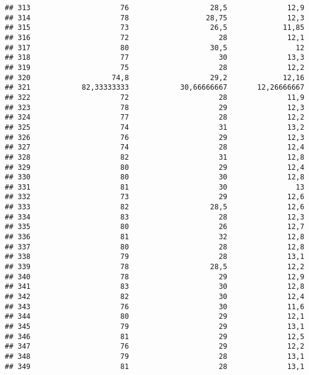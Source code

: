 \documentclass[
]{article}
\begin{document}
\begin{verbatim}
## 313                     76                   28,5              12,9
## 314                     78                  28,75              12,3
## 315                     73                   26,5             11,85
## 316                     72                     28              12,1
## 317                     80                   30,5                12
## 318                     77                     30              13,3
## 319                     75                     28              12,2
## 320                   74,8                   29,2             12,16
## 321            82,33333333            30,66666667       12,26666667
## 322                     72                     28              11,9
## 323                     78                     29              12,3
## 324                     77                     28              12,2
## 325                     74                     31              13,2
## 326                     76                     29              12,3
## 327                     74                     28              12,4
## 328                     82                     31              12,8
## 329                     80                     29              12,4
## 330                     80                     30              12,8
## 331                     81                     30                13
## 332                     73                     29              12,6
## 333                     82                   28,5              12,6
## 334                     83                     28              12,3
## 335                     80                     26              12,7
## 336                     81                     32              12,8
## 337                     80                     28              12,8
## 338                     79                     28              13,1
## 339                     78                   28,5              12,2
## 340                     78                     29              12,9
## 341                     83                     30              12,8
## 342                     82                     30              12,4
## 343                     76                     30              11,6
## 344                     80                     29              12,1
## 345                     79                     29              13,1
## 346                     81                     29              12,5
## 347                     76                     29              12,2
## 348                     79                     28              13,1
## 349                     81                     28              13,1

\end{verbatim}
\end{document}
